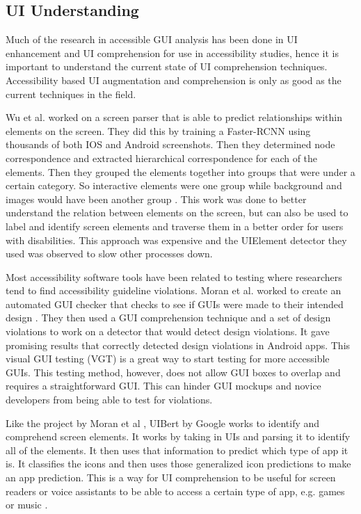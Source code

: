 \subsection{UI Understanding}

Much of the research in accessible GUI analysis has been done in UI enhancement and UI comprehension for use in accessibility studies, hence it is important to understand the current state of UI comprehension techniques. Accessibility based UI augmentation and comprehension is only as good as the current techniques in the field. 

Wu et al. \cite{41} worked on a screen parser that is able to predict relationships within elements on the screen. They did this by training a Faster-RCNN using thousands of both IOS and Android screenshots. Then they  determined node correspondence and extracted hierarchical correspondence for each of the elements. Then they grouped the elements together into groups that were under a certain category. So interactive elements were one group while background and images would have been another group \cite{41}. This work was done to better understand the relation between elements on the screen, but can also be used to label and identify screen elements and traverse them in a better order for users with disabilities. This approach was expensive and the UIElement detector they used was observed to slow other processes down.

Most accessibility software tools have been related to testing where researchers tend to find accessibility guideline violations. Moran et al. \cite{42} worked to create an automated GUI checker that checks to see if GUIs were made to their intended design \cite{42}. They then used a GUI comprehension technique and a set of design violations to work on a detector that would detect design violations. It gave promising results that correctly detected design violations in Android apps. This visual GUI testing (VGT) is a great way to start testing for more accessible GUIs. This testing method, however, does not allow GUI boxes to overlap and requires a straightforward GUI. This can hinder GUI mockups and novice developers from being able to test for violations. 

Like the project by Moran et al \cite{42}, UIBert by Google \cite{43} works to identify and comprehend screen elements. It works by taking in UIs and parsing it to identify all of the elements. It then uses that information to predict which type of app it is. It classifies the icons and then uses those generalized icon predictions to make an app prediction. This is a way for UI comprehension to be useful for screen readers or voice assistants to be able to access a certain type of app, e.g. games or music \cite{43}.  

